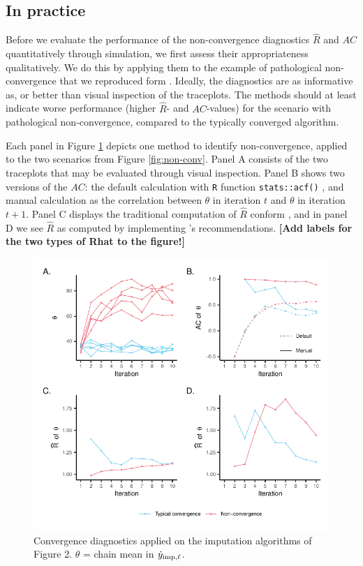 \documentclass[Royal,times,sageh]{sagej}
\begin{document}
\hypertarget{in-practice}{%
\subsection{In practice}\label{in-practice}}

Before we evaluate the performance of the non-convergence diagnostics \(\widehat{R}\) and \(AC\) quantitatively through simulation, we first assess their appropriateness qualitatively. We do this by applying them to the example of pathological non-convergence that we reproduced form \citet{buur18}. Ideally, the diagnostics are as informative as, or better than visual inspection of the traceplots. The methods should at least indicate worse performance (higher \(\widehat{R}\)- and \(AC\)-values) for the scenario with pathological non-convergence, compared to the typically converged algorithm.

Each panel in Figure \ref{fig:diagnostics} depicts one method to identify non-convergence, applied to the two scenarios from Figure \ref{fig:non-conv}. Panel A consists of the two traceplots that may be evaluated through visual inspection. Panel B shows two versions of the \(AC\): the default calculation with \texttt{R} function \texttt{stats::acf()} \citep{R}, and manual calculation as the correlation between \(\theta\) in iteration \(t\) and \(\theta\) in iteration \(t+1\). Panel C displays the traditional computation of \(\widehat{R}\) conform \citet{gelm92}, and in panel D we see \(\widehat{R}\) as computed by implementing \citet{veht19} 's recommendations. \textbf{{[}Add labels for the two types of Rhat to the figure!{]}}

\begin{figure}

{\centering \includegraphics{2.Manuscript_files/figure-latex/diagnostics-1} 

}

\caption{Convergence diagnostics applied on the imputation algorithms of Figure 2. $\theta$ = chain mean in $ \dot y_{\rm imp, \ell} $.}\label{fig:diagnostics}
\end{figure}
\end{document}
